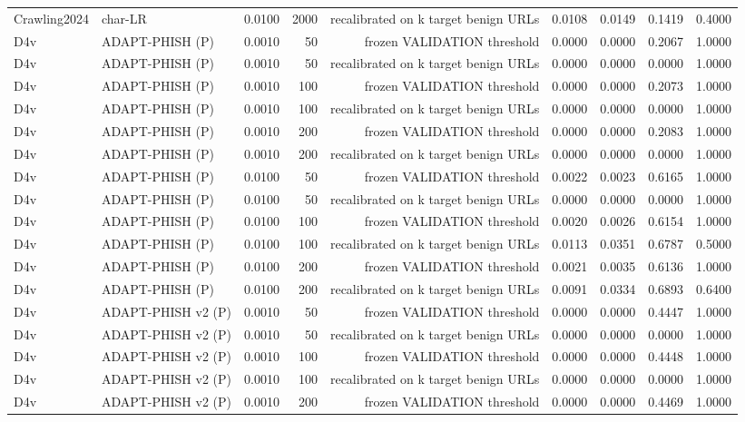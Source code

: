 \begin{table}[t]
\begin{tabular}{llrrrrrrr}
Crawling2024 & char-LR & 0.0100 & 2000 & recalibrated on k target benign URLs & 0.0108 & 0.0149 & 0.1419 & 0.4000 \\
D4v & ADAPT-PHISH (P) & 0.0010 & 50 & frozen VALIDATION threshold & 0.0000 & 0.0000 & 0.2067 & 1.0000 \\
D4v & ADAPT-PHISH (P) & 0.0010 & 50 & recalibrated on k target benign URLs & 0.0000 & 0.0000 & 0.0000 & 1.0000 \\
D4v & ADAPT-PHISH (P) & 0.0010 & 100 & frozen VALIDATION threshold & 0.0000 & 0.0000 & 0.2073 & 1.0000 \\
D4v & ADAPT-PHISH (P) & 0.0010 & 100 & recalibrated on k target benign URLs & 0.0000 & 0.0000 & 0.0000 & 1.0000 \\
D4v & ADAPT-PHISH (P) & 0.0010 & 200 & frozen VALIDATION threshold & 0.0000 & 0.0000 & 0.2083 & 1.0000 \\
D4v & ADAPT-PHISH (P) & 0.0010 & 200 & recalibrated on k target benign URLs & 0.0000 & 0.0000 & 0.0000 & 1.0000 \\
D4v & ADAPT-PHISH (P) & 0.0100 & 50 & frozen VALIDATION threshold & 0.0022 & 0.0023 & 0.6165 & 1.0000 \\
D4v & ADAPT-PHISH (P) & 0.0100 & 50 & recalibrated on k target benign URLs & 0.0000 & 0.0000 & 0.0000 & 1.0000 \\
D4v & ADAPT-PHISH (P) & 0.0100 & 100 & frozen VALIDATION threshold & 0.0020 & 0.0026 & 0.6154 & 1.0000 \\
D4v & ADAPT-PHISH (P) & 0.0100 & 100 & recalibrated on k target benign URLs & 0.0113 & 0.0351 & 0.6787 & 0.5000 \\
D4v & ADAPT-PHISH (P) & 0.0100 & 200 & frozen VALIDATION threshold & 0.0021 & 0.0035 & 0.6136 & 1.0000 \\
D4v & ADAPT-PHISH (P) & 0.0100 & 200 & recalibrated on k target benign URLs & 0.0091 & 0.0334 & 0.6893 & 0.6400 \\
D4v & ADAPT-PHISH v2 (P) & 0.0010 & 50 & frozen VALIDATION threshold & 0.0000 & 0.0000 & 0.4447 & 1.0000 \\
D4v & ADAPT-PHISH v2 (P) & 0.0010 & 50 & recalibrated on k target benign URLs & 0.0000 & 0.0000 & 0.0000 & 1.0000 \\
D4v & ADAPT-PHISH v2 (P) & 0.0010 & 100 & frozen VALIDATION threshold & 0.0000 & 0.0000 & 0.4448 & 1.0000 \\
D4v & ADAPT-PHISH v2 (P) & 0.0010 & 100 & recalibrated on k target benign URLs & 0.0000 & 0.0000 & 0.0000 & 1.0000 \\
D4v & ADAPT-PHISH v2 (P) & 0.0010 & 200 & frozen VALIDATION threshold & 0.0000 & 0.0000 & 0.4469 & 1.0000 \\

\end{tabular}
\end{table}
